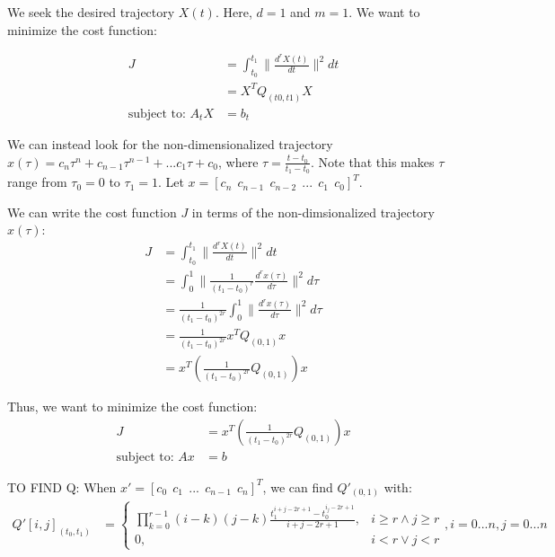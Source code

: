\documentclass[11pt]{article}
\begin{document}
\mbox{} \newline
We seek the desired trajectory $X(t)$. Here, $d = 1$ and $m = 1$. We want to minimize the cost function:

\begin{align*}
J &= \int_{t_0}^{t_1} \|  \frac{d^{r} X(t) }{dt} \|^2 dt  \\
&= X^T Q_{(t0, t1)} X \\
\text{subject to: } A_t X &= b_t
\end{align*}

We can instead look for the non-dimensionalized trajectory $x(\tau) = c_n \tau^n + c_{n-1} \tau^{n-1} + ... c_1 \tau + c_0$, where $\tau = \frac{t-t_0}{t_1-t_0}$. Note that this makes $\tau$ range from $\tau_0 = 0$ to $\tau_1 = 1$. Let $x = [c_n \ \ c_{n-1} \ \ c_{n-2} \ \ ... \ \ c_1 \ \ c_0]^T$. 

\mbox{} \newline
We can write the cost function $J$ in terms of the non-dimsionalized trajectory $x(\tau)$: 
\begin{align*}
J &= \int_{t_0}^{t_1} \|  \frac{d^{r} X(t) }{dt} \|^2 dt  \\
&= \int_{0}^{1} \|  \frac{1}{(t_1-t_0)^r} \frac{d^{r} x(\tau) }{d\tau} \|^2 d \tau  \\
&=  \frac{1}{(t_1-t_0)^{2r}} \int_{0}^{1} \| \frac{d^{r} x(\tau) }{d\tau} \|^2 d \tau \\
&= \frac{1}{(t_1-t_0)^{2r}} x^T Q_{(0, 1)} x \\
&= x^T \left( \frac{1}{(t_1-t_0)^{2r}} Q_{(0, 1)}\right) x
\end{align*}

Thus, we want to minimize the cost function: 
\begin{align*}
J &= x^T \left( \frac{1}{(t_1-t_0)^{2r}} Q_{(0, 1)}\right) x \\
\text{subject to: } A x &= b
\end{align*}

\mbox{} \newline
\mbox{} \newline
TO FIND Q: \newline
When $x' = [c_0 \ \ c_1 \ \ ... \ \ c_{n-1} \ \ c_n]^T$, we can find $Q'_{(0, 1)}$ with: 
\begin{align}
\label{eqn: Q}  Q'[i, j]_{(t_0, t_1)} &= 
\begin{cases}
    \prod_{k = 0}^{r-1} {(i-k)(j-k)} \frac{ t_1^{i+j-2r+1} - t_0^{i_j-2r+1} }{i+j-2r+1}, & i \ge r \land j \ge r \\
    0, & i < r \lor j < r 
\end{cases}, i = 0...n, j = 0...n
\end{align}
\end{document}
